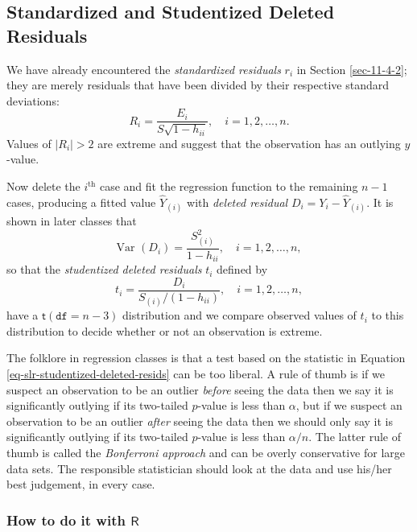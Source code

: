 \documentclass[captions=tableheading]{scrbook}
\begin{document}
\subsection{Standardized and Studentized Deleted Residuals}
\label{sec-11-5-3}


We have already encountered the \emph{standardized residuals} \(r_{i}\) in Section \ref{sec-11-4-2}; they are merely residuals that have been divided by their respective standard deviations: 
\begin{equation}
R_{i}=\frac{E_{i}}{S\sqrt{1-h_{ii}}},\quad i=1,2,\ldots,n.
\end{equation}
Values of \(|R_{i}| > 2\) are extreme and suggest that the observation has an outlying \(y\)-value. 

Now delete the \(i^{\mathrm{th}}\) case and fit the regression function to the remaining \(n - 1\) cases, producing a fitted value \(\hat{Y}_{(i)}\) with \emph{deleted residual} \(D_{i}=Y_{i}-\hat{Y}_{(i)}\). It is shown in later classes that 
\begin{equation}
\mbox{Var $(D_{i})$}=\frac{S_{(i)}^{2}}{1-h_{ii}},\quad i=1,2,\ldots,n,
\end{equation}
so that the \emph{studentized deleted residuals} \(t_{i}\) defined by
\begin{equation}
t_{i}=\frac{D_{i}}{S_{(i)}/(1-h_{ii})},\quad i=1,2,\ldots,n,\label{eq-slr-studentized-deleted-resids}
\end{equation}
have a \(\mathsf{t}(\mathtt{df}=n-3)\) distribution and we compare observed values of \(t_{i}\) to this distribution to decide whether or not an observation is extreme. 

The folklore in regression classes is that a test based on the statistic in Equation \ref{eq-slr-studentized-deleted-resids} can be too liberal. A rule of thumb is if we suspect an observation to be an outlier \emph{before} seeing the data then we say it is significantly outlying if its two-tailed \(p\)-value is less than \(\alpha\), but if we suspect an observation to be an outlier \emph{after} seeing the data then we should only say it is significantly outlying if its two-tailed \(p\)-value is less than \(\alpha/n\). The latter rule of thumb is called the \emph{Bonferroni approach} and can be overly conservative for large data sets. The responsible statistician should look at the data and use his/her best judgement, in every case.
\subsubsection{How to do it with \(\mathsf{R}\)}
\label{sec-11-5-3-1}
\end{document}
